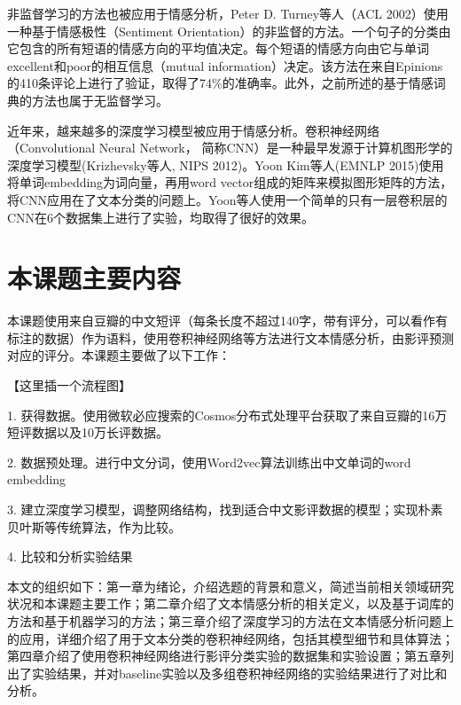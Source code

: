 非监督学习的方法也被应用于情感分析，Peter D. Turney等人（ACL  2002）使用一种基于情感极性（Sentiment Orientation）的非监督的方法。一个句子的分类由它包含的所有短语的情感方向的平均值决定。每个短语的情感方向由它与单词excellent和poor的相互信息（mutual information）决定。该方法在来自Epinions的410条评论上进行了验证，取得了74\%的准确率。此外，之前所述的基于情感词典的方法也属于无监督学习。

近年来，越来越多的深度学习模型被应用于情感分析。卷积神经网络（Convolutional Neural Network， 简称CNN）是一种最早发源于计算机图形学的深度学习模型(Krizhevsky等人, NIPS 2012)。Yoon Kim等人(EMNLP 2015)使用将单词embedding为词向量，再用word vector组成的矩阵来模拟图形矩阵的方法，将CNN应用在了文本分类的问题上。Yoon等人使用一个简单的只有一层卷积层的CNN在6个数据集上进行了实验，均取得了很好的效果。


\section{本课题主要内容}
本课题使用来自豆瓣的中文短评（每条长度不超过140字，带有评分，可以看作有标注的数据）作为语料，使用卷积神经网络等方法进行文本情感分析，由影评预测对应的评分。本课题主要做了以下工作：

【这里插一个流程图】

1.	获得数据。使用微软必应搜索的Cosmos分布式处理平台获取了来自豆瓣的16万短评数据以及10万长评数据。

2.	数据预处理。进行中文分词，使用Word2vec算法训练出中文单词的word embedding

3.	建立深度学习模型，调整网络结构，找到适合中文影评数据的模型；实现朴素贝叶斯等传统算法，作为比较。

4.	比较和分析实验结果

本文的组织如下：第一章为绪论，介绍选题的背景和意义，简述当前相关领域研究状况和本课题主要工作；第二章介绍了文本情感分析的相关定义，以及基于词库的方法和基于机器学习的方法；第三章介绍了深度学习的方法在文本情感分析问题上的应用，详细介绍了用于文本分类的卷积神经网络，包括其模型细节和具体算法；第四章介绍了使用卷积神经网络进行影评分类实验的数据集和实验设置；第五章列出了实验结果，并对baseline实验以及多组卷积神经网络的实验结果进行了对比和分析。
